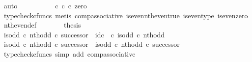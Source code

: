 \begin{isabellebody}
\ auto\isanewline
\ \ \ \ \isamarkupfalse%
\ \isamarkupfalse%
\ {\isachardoublequoteopen}{\isachardot}{\kern0pt}{\isachardot}{\kern0pt}{\isachardot}{\kern0pt}\ {\isacharequal}{\kern0pt}\ {\isacharparenleft}{\kern0pt}{\isasymt}\ {\isasymcirc}\isactrlsub c\ {\isasymbeta}\isactrlbsub {\isasymnat}\isactrlsub c\isactrlesub {\isacharparenright}{\kern0pt}\ {\isasymcirc}\isactrlsub c\ zero{\isachardoublequoteclose}\isanewline
\ \ \ \ \ \ \isamarkupfalse%
\ {\isacharparenleft}{\kern0pt}typecheck{\isacharunderscore}{\kern0pt}cfuncs{\isacharcomma}{\kern0pt}\ metis\ comp{\isacharunderscore}{\kern0pt}associative{}\ is{\isacharunderscore}{\kern0pt}even{\isacharunderscore}{\kern0pt}nth{\isacharunderscore}{\kern0pt}even{\isacharunderscore}{\kern0pt}true\ is{\isacharunderscore}{\kern0pt}even{\isacharunderscore}{\kern0pt}type\ is{\isacharunderscore}{\kern0pt}even{\isacharunderscore}{\kern0pt}zero\ nth{\isacharunderscore}{\kern0pt}even{\isacharunderscore}{\kern0pt}def{}{\isacharparenright}{\kern0pt}\isanewline
\ \ \ \ \isamarkupfalse%
\ \isamarkupfalse%
\ {\isacharquery}{\kern0pt}thesis\isacommand{{\isachardot}{\kern0pt}}\isamarkupfalse%
\isanewline
\ \ \isamarkupfalse%
\isanewline
\isanewline
\ \ \isamarkupfalse%
\ {\isachardoublequoteopen}{\isacharparenleft}{\kern0pt}is{\isacharunderscore}{\kern0pt}odd\ {\isasymcirc}\isactrlsub c\ nth{\isacharunderscore}{\kern0pt}odd{\isacharparenright}{\kern0pt}\ {\isasymcirc}\isactrlsub c\ successor\ {\isacharequal}{\kern0pt}\ id\isactrlsub c\ {\isasymOmega}\ {\isasymcirc}\isactrlsub c\ is{\isacharunderscore}{\kern0pt}odd\ {\isasymcirc}\isactrlsub c\ nth{\isacharunderscore}{\kern0pt}odd{\isachardoublequoteclose}\isanewline
\ \ \isamarkupfalse%
\ {\isacharminus}{\kern0pt}\isanewline
\ \ \ \ \isamarkupfalse%
\ {\isachardoublequoteopen}{\isacharparenleft}{\kern0pt}is{\isacharunderscore}{\kern0pt}odd\ {\isasymcirc}\isactrlsub c\ nth{\isacharunderscore}{\kern0pt}odd{\isacharparenright}{\kern0pt}\ {\isasymcirc}\isactrlsub c\ successor\ {\isacharequal}{\kern0pt}\ is{\isacharunderscore}{\kern0pt}odd\ {\isasymcirc}\isactrlsub c\ nth{\isacharunderscore}{\kern0pt}odd\ {\isasymcirc}\isactrlsub c\ successor{\isachardoublequoteclose}\isanewline
\ \ \ \ \ \ \isamarkupfalse%
\ {\isacharparenleft}{\kern0pt}typecheck{\isacharunderscore}{\kern0pt}cfuncs{\isacharcomma}{\kern0pt}\ simp\ add{\isacharcolon}{\kern0pt}\ comp{\isacharunderscore}{\kern0pt}associative{}{\isacharparenright}{\kern0pt}\isanewline

\end{isabellebody}
